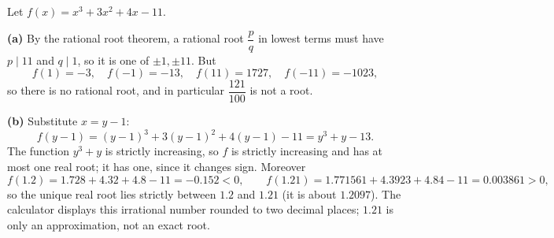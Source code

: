 Let $f(x)=x^3+3x^2+4x-11$.

\textbf{(a)} By the rational root theorem, a rational root $\dfrac {p}{q}$ in lowest terms must have $p\mid11$ and $q\mid1$, so it is one of $\pm1,\pm11$. But
\[f(1)=-3,\quad f(-1)=-13,\quad f(11)=1727,\quad f(-11)=-1023,\]
so there is no rational root, and in particular $\dfrac{121}{100}$ is not a root.

\textbf{(b)} Substitute $x=y-1$:
\[f(y-1)=(y-1)^3+3(y-1)^2+4(y-1)-11=y^3+y-13 .\]
The function $y^3+y$ is strictly increasing, so $f$ is strictly increasing and has at most one real root; it has one, since it changes sign. Moreover
\[f(1.2)=1.728+4.32+4.8-11=-0.152<0,\qquad f(1.21)=1.771561+4.3923+4.84-11=0.003861>0,\]
so the unique real root lies strictly between $1.2$ and $1.21$ (it is about $1.2097$). The calculator displays this irrational number rounded to two decimal places; $1.21$ is only an approximation, not an exact root.
